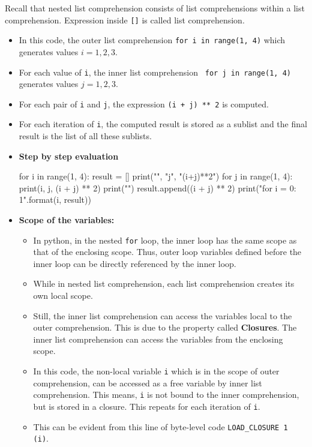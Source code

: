 \documentclass[10pt]{extarticle}
\begin{document}
Recall that nested list comprehension consists of list comprehensions within a list comprehension. Expression inside \texttt{[]} is called list comprehension.
\begin{itemize}
    \item In this code, the outer list comprehension \colorbox{gray!20}{\texttt{for i in range(1, 4)}}
    which generates values $i = 1,2,3$.
    \item For each value of \texttt{i}, the inner list comprehension \colorbox{gray!20}{\texttt{ for j in range(1, 4)}}
    generates values $j = 1,2,3$.
    \item For each pair of \texttt{i} and \texttt{j}, the expression \colorbox{gray!20}{\texttt{(i + j) ** 2}} is computed.
    \item For each iteration of \texttt{i}, the computed result is stored as a sublist and the final result is the list of all these sublists.
    \item \textbf{Step by step evaluation}
    \begin{tcolorbox}[colback=gray!20, colframe=gray!50, sharp corners=southwest]
    \begin{pycode}
for i in range(1, 4):
    result = []
    print("\ni", "j", "(i+j)**2\n")
    for j in range(1, 4):
        print(i, j, (i + j) ** 2)
        print("\n")
        result.append((i + j) ** 2)
    print("\nSublist for i = {0}: {1}\n".format(i, result))
    \end{pycode}
    \end{tcolorbox}
    \item \textbf{Scope of the variables:} 
    \begin{itemize}
        \item In python, in the nested \texttt{for} loop, the inner loop has the same scope as that of the enclosing scope. Thus, outer loop variables defined before the inner loop can be directly referenced by the inner loop.   
        \item While in nested list comprehension, each list comprehension creates its own local scope. 
        \item Still, the inner list comprehension can access the variables local to the outer comprehension. This is due to the property called \textbf{Closures}. The inner list comprehension can access the variables from the enclosing scope.
        \item In this code, the non-local variable \texttt{i} which is in the scope of outer comprehension,  can be accessed as a free variable by inner list comprehension. This means, \texttt{i} is not bound to the inner comprehension, but is stored in a closure. This repeats for each iteration of \texttt{i}.
        \item This can be evident from this line of byte-level code  \colorbox{gray!20}{\texttt{LOAD\_CLOSURE 1 (i)}}.
    \end{itemize}
    
\end{itemize} 
\bigskip  
\end{document}
